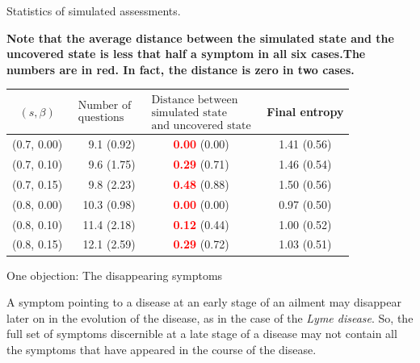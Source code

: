 \documentclass{beamer}
\def\wl{\vskip 4mm}
\def\rtxt#1{\textcolor{red}{#1}}
\begin{document}
\begin{frame}{Statistics of simulated assessments.}
\center
\begin{minipage}{12cm}
{\bf Note that the average distance between the simulated state and the uncovered state is less that half a symptom in all six cases.\linebreak The numbers are in red. In fact, the distance is zero in two cases.}
\end{minipage}
 \wl 
\begin{center}
  \renewcommand{\arraystretch}{1.3}
\renewcommand{\tabcolsep}{.3cm}
\begin{tabular}{|c|r|c|c|} 
\hline
$(s, \beta)$&$\begin{matrix}\text{Number of}\\[-2mm]\text{questions}\end{matrix}$&
$\begin{matrix}\text{Distance between}\\[-2mm] \text{simulated state}\\[-2mm] \text{and uncovered state}\end{matrix}$&
Final entropy\\
\hline
(0.7, 0.00)&9.1 (0.92)&\rtxt{\bf 0.00} (0.00)&1.41 (0.56)\\
(0.7, 0.10)&9.6 (1.75)&\rtxt{\bf 0.29} (0.71)&1.46 (0.54)\\
(0.7, 0.15)&9.8 (2.23)&\rtxt{\bf 0.48} (0.88)&1.50 (0.56)\\
(0.8, 0.00)&10.3 (0.98)&\rtxt{\bf 0.00} (0.00)&0.97 (0.50)\\
(0.8, 0.10)&11.4 (2.18)&\rtxt{\bf 0.12} (0.44)&1.00 (0.52)\\
(0.8, 0.15)&12.1 (2.59)&\rtxt{\bf 0.29} (0.72)&1.03 (0.51)\\
\hline
\end{tabular}
 \end{center}
 \vspace{.2cm}

\end{frame}
\begin{frame}{One objection: The disappearing symptoms}

\center
\begin{minipage}{11.5cm}
A symptom pointing  to a disease at an early stage of an ailment may disappear  later on in the evolution of the disease, as in the case of the {\sl Lyme disease}. So, the full set of symptoms discernible  at a late stage of a disease may not contain all the symptoms that have appeared in the course of the disease. 
\end{minipage}
\vspace{1cm}

\end{frame}
\end{document}
